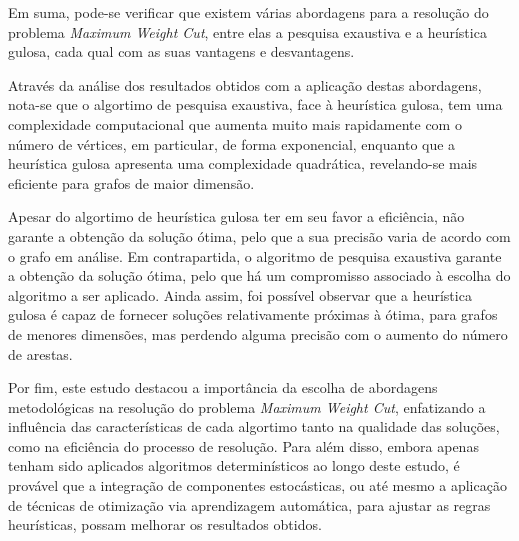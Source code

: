\documentclass[mirror, portugues]{revdetua}
\begin{document}
Em suma, pode-se verificar que existem várias abordagens para a resolução do problema \textit{Maximum Weight Cut}, entre elas a pesquisa exaustiva e a heurística gulosa, cada qual com as suas vantagens e desvantagens.

Através da análise dos resultados obtidos com a aplicação destas abordagens, nota-se que o algortimo de pesquisa exaustiva, face à heurística gulosa, tem uma complexidade computacional que aumenta muito mais rapidamente com o número de vértices, em particular, de forma exponencial, enquanto que a heurística gulosa apresenta uma complexidade quadrática, revelando-se mais eficiente para grafos de maior dimensão.

Apesar do algortimo de heurística gulosa ter em seu favor a eficiência, não garante a obtenção da solução ótima, pelo que a sua precisão varia de acordo com o grafo em análise. Em contrapartida, o algoritmo de pesquisa exaustiva garante a obtenção da solução ótima, pelo que há um compromisso associado à escolha do algoritmo a ser aplicado. Ainda assim, foi possível observar que a heurística gulosa é capaz de fornecer soluções relativamente próximas à ótima, para grafos de menores dimensões, mas perdendo alguma precisão com o aumento do número de arestas.

Por fim, este estudo destacou a importância da escolha de abordagens metodológicas na resolução do problema \textit{Maximum Weight Cut}, enfatizando a influência das características de cada algortimo tanto na qualidade das soluções, como na eficiência do processo de resolução. Para além disso, embora apenas tenham sido aplicados algoritmos determinísticos ao longo deste estudo, é provável que a integração de componentes estocásticas, ou até mesmo a aplicação de técnicas de otimização via aprendizagem automática, para ajustar as regras heurísticas, possam melhorar os resultados obtidos.


\end{document}
